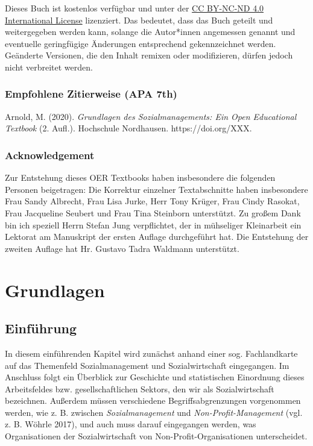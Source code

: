 \documentclass[
  letterpaper,
]{book}
\begin{document}
Dieses Buch ist kostenlos verfügbar und unter der
\href{https://creativecommons.org/licenses/by-nc-sa/4.0/}{CC BY-NC-ND
4.0 International License} lizenziert. Das bedeutet, dass das Buch
geteilt und weitergegeben werden kann, solange die Autor*innen
angemessen genannt und eventuelle geringfügige Änderungen entsprechend
gekennzeichnet werden. Geänderte Versionen, die den Inhalt remixen oder
modifizieren, dürfen jedoch nicht verbreitet werden.

\section*{Empfohlene Zitierweise (APA
7th)}\label{empfohlene-zitierweise-apa-7th}


Arnold, M. (2020). \emph{Grundlagen des Sozialmanagements: Ein Open
Educational Textbook} (2. Aufl.). Hochschule Nordhausen.
https://doi.org/XXX.

\section*{Acknowledgement}\label{acknowledgement}


Zur Entstehung dieses OER Textbooks haben insbesondere die folgenden
Personen beigetragen: Die Korrektur einzelner Textabschnitte haben
insbesondere Frau Sandy Albrecht, Frau Lisa Jurke, Herr Tony Krüger,
Frau Cindy Rasokat, Frau Jacqueline Seubert und Frau Tina Steinborn
unterstützt. Zu großem Dank bin ich speziell Herrn Stefan Jung
verpflichtet, der in mühseliger Kleinarbeit ein Lektorat am Manuskript
der ersten Auflage durchgeführt hat. Die Entstehung der zweiten Auflage
hat Hr. Gustavo Tadra Waldmann unterstützt.

\part{Grundlagen}

\chapter{Einführung}\label{einfuehrung}

In diesem einführenden Kapitel wird zunächst anhand einer sog.
Fachlandkarte auf das Themenfeld Sozialmanagement und Sozialwirtschaft
eingegangen. Im Anschluss folgt ein Überblick zur Geschichte und
statistischen Einordnung dieses Arbeitsfeldes bzw. gesellschaftlichen
Sektors, den wir als Sozialwirtschaft bezeichnen. Außerdem müssen
verschiedene Begriffsabgrenzungen vorgenommen werden, wie z. B. zwischen
\emph{Sozialmanagement} und \emph{Non-Profit-Management} (vgl. z. B.
Wöhrle 2017), und auch muss darauf eingegangen werden, was
Organisationen der Sozialwirtschaft von Non-Profit-Organisationen
unterscheidet.
\end{document}
